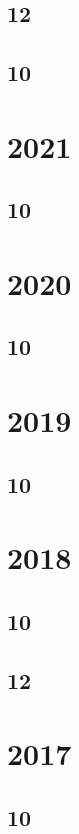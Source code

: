 \documentclass[11pt]{book}
\begin{document}
\subsection{12}

\subsection{10}


\section{2021}
\subsection{10}

\section{2020}
\subsection{10}

\section{2019} 
\subsection{10}

\section{2018} 
\subsection{10}

\subsection{12}

\section{2017}
\subsection{10}

\end{document}
